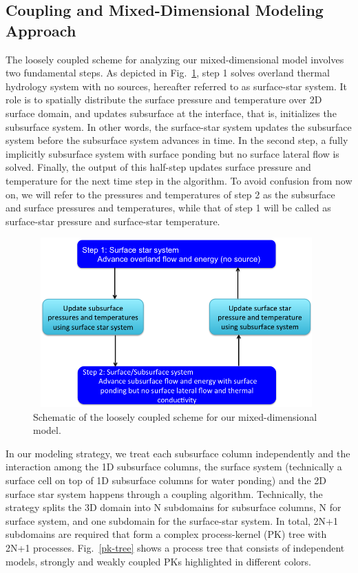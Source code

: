 \documentclass[review]{elsarticle}
\begin{document}
\subsection{Coupling and Mixed-Dimensional Modeling Approach}
The loosely coupled scheme for analyzing our mixed-dimensional model involves two fundamental steps. As depicted in Fig.~\ref{coupling-schematic}, step 1 solves overland thermal hydrology system with no sources, hereafter referred to as surface-star system. It role is to spatially distribute the surface pressure and temperature over 2D surface domain, and updates subsurface at the interface, that is, initializes the subsurface system. In other words, the surface-star system updates the subsurface system before the subsurface system advances in time. In the second step, a fully implicitly subsurface system with surface ponding but no surface lateral flow is solved. Finally, the output of this half-step updates surface pressure and temperature for the next time step in the algorithm. To avoid confusion from now on, we will refer to the pressures and temperatures of step 2 as the subsurface and surface pressures and temperatures, while that of step 1 will be called as surface-star pressure and surface-star temperature.

\begin{figure}[!htpb]
\centering
\includegraphics[height = 6.5cm, width=11cm]{figures/shematic-couplingscheme1.png}
\caption{Schematic of the loosely coupled scheme for our mixed-dimensional model.}
\label{coupling-schematic}
\end{figure}



In our modeling strategy, we treat each subsurface column independently and the interaction among the 1D subsurface columns, the surface system (technically a surface cell on top of 1D subsurface columns for water ponding) and the 2D surface star system happens through a coupling algorithm. Technically, the strategy splits the 3D domain into N subdomains for subsurface columns, N for surface system, and one subdomain for the surface-star system. In total, 2N+1 subdomains are required that form a complex process-kernel (PK) tree with 2N+1 processes. Fig.~\ref{pk-tree} shows a process tree that consists of independent models, strongly  and weakly coupled PKs highlighted in different colors.  
\end{document}
